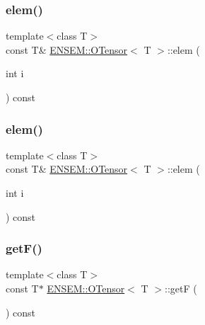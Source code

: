 \mbox{\label{classENSEM_1_1OTensor_a788f146a247856d6b391cfd8f903657b}} 
\subsubsection{\texorpdfstring{elem()}{elem()}\hspace{0.1cm}{\footnotesize\ttfamily [3/4]}}
{\footnotesize\ttfamily template$<$class T$>$ \\
const T\& \mbox{\hyperlink{classENSEM_1_1OTensor}{E\+N\+S\+E\+M\+::\+O\+Tensor}}$<$ T $>$\+::elem (\begin{DoxyParamCaption}\item[{int}]{i }\end{DoxyParamCaption}) const\hspace{0.3cm}{\ttfamily [inline]}}

\mbox{\label{classENSEM_1_1OTensor_a788f146a247856d6b391cfd8f903657b}} 
\subsubsection{\texorpdfstring{elem()}{elem()}\hspace{0.1cm}{\footnotesize\ttfamily [4/4]}}
{\footnotesize\ttfamily template$<$class T$>$ \\
const T\& \mbox{\hyperlink{classENSEM_1_1OTensor}{E\+N\+S\+E\+M\+::\+O\+Tensor}}$<$ T $>$\+::elem (\begin{DoxyParamCaption}\item[{int}]{i }\end{DoxyParamCaption}) const\hspace{0.3cm}{\ttfamily [inline]}}

\mbox{\label{classENSEM_1_1OTensor_ac9462508146fa6ceba2797c9994ea54c}} 
\subsubsection{\texorpdfstring{getF()}{getF()}\hspace{0.1cm}{\footnotesize\ttfamily [1/4]}}
{\footnotesize\ttfamily template$<$class T$>$ \\
const T$\ast$ \mbox{\hyperlink{classENSEM_1_1OTensor}{E\+N\+S\+E\+M\+::\+O\+Tensor}}$<$ T $>$\+::getF (\begin{DoxyParamCaption}{ }\end{DoxyParamCaption}) const\hspace{0.3cm}{\ttfamily [inline]}}



